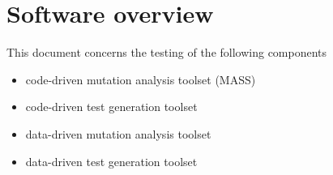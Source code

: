 
\chapter{Software overview}


This document concerns the testing of the following components
\begin{itemize}
	\item code-driven mutation analysis toolset (MASS)
	\item code-driven test generation toolset
	\item data-driven mutation analysis toolset
	\item data-driven test generation toolset
\end{itemize}


